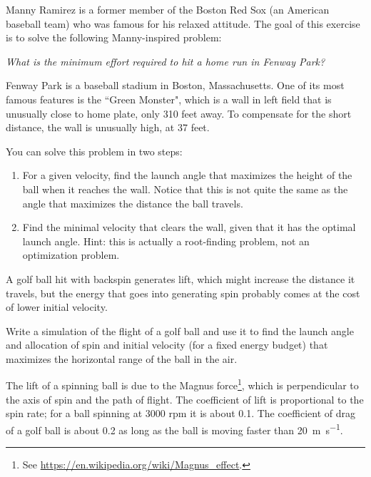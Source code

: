 \begin{ex}


Manny Ramirez is a former member of the Boston Red Sox (an American baseball team) who was famous for his relaxed attitude.  The goal of this exercise is to solve the following Manny-inspired problem:

{\it What is the minimum effort required to hit a home run in Fenway Park?}


Fenway Park is a baseball stadium in Boston, Massachusetts.  One of its most famous features is the ``Green Monster", which is a wall in left field that is unusually close to home plate, only 310 feet away.  To compensate for the short distance, the wall is unusually high, at 37 feet.


You can solve this problem in two steps:

\begin{enumerate}

\item For a given velocity, find the launch angle that maximizes the height of the ball when it reaches the wall.  Notice that this is not quite the same as the angle that maximizes the distance the ball travels.


\item Find the minimal velocity that clears the wall, given that it has the optimal launch angle.  Hint: this is actually a root-finding problem, not an optimization problem.

\end{enumerate}

\end{ex}

\begin{ex}
\label{golf}


A golf ball hit with backspin generates lift, which might increase the distance it travels, but the energy that goes into generating spin probably comes at the cost of lower initial velocity.

Write a simulation of the flight of a golf ball and use it to find
the launch angle and allocation of spin and initial velocity
(for a fixed energy budget) that maximizes the horizontal range of the
ball in the air.

The lift of a spinning ball is due to the Magnus force\footnote{See
\url{https://en.wikipedia.org/wiki/Magnus_effect}.}, which is
perpendicular to the axis of spin and the path of flight.  The
coefficient of lift is proportional to the spin rate; for a ball
spinning at 3000 rpm it is about 0.1.  The coefficient of drag of a
golf ball is about 0.2 as long as the ball is moving faster than \SI{20}{\meter\per\second}.

\end{ex}

